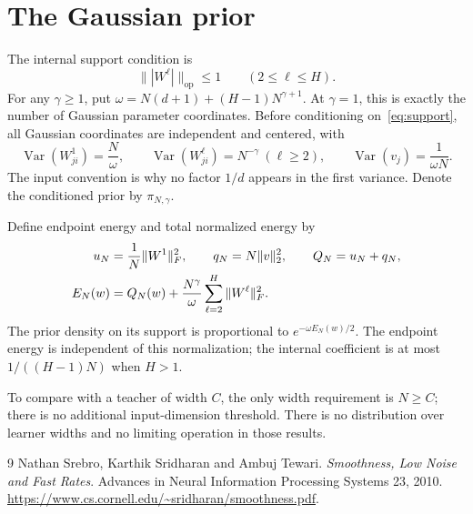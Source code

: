 \documentclass[11pt]{article}
\theoremstyle{definition}\newtheorem{definition}[theorem]{Definition}
\theoremstyle{remark}\newtheorem{remark}[theorem]{Remark}
\newcommand{\op}{\mathrm{op}}\newcommand{\VarPath}{\mathcal V}
\begin{document}
\section{The Gaussian prior}
The internal support condition is
\begin{equation}
 \bigl\||W^\ell|\bigr\|_{\op}\le1\qquad(2\le\ell\le H).
 \label{eq:support}
\end{equation}
For any $\gamma\ge1$, put $\omega=N(d+1)+(H-1)N^{\gamma+1}$. At $\gamma=1$, this is exactly the number of Gaussian parameter coordinates. Before conditioning on~\eqref{eq:support}, all Gaussian coordinates are independent and centered, with
\begin{equation}
 \operatorname{Var}(W^1_{ji})=\frac N\omega,\qquad
 \operatorname{Var}(W^\ell_{ji})=N^{-\gamma}\ (\ell\ge2),\qquad
 \operatorname{Var}(v_j)=\frac1{\omega N}.
 \label{eq:prior}
\end{equation}
The input convention is why no factor $1/d$ appears in the first variance. Denote the conditioned prior by $\pi_{N,\gamma}$.

Define endpoint energy and total normalized energy by
\begin{align}
 u_N&=\frac1N\|W^1\|_F^2,\qquad q_N=N\|v\|_2^2,\qquad Q_N=u_N+q_N,\notag\\
 E_N(w)&=Q_N(w)+\frac{N^\gamma}{\omega}\sum_{\ell=2}^H\|W^\ell\|_F^2.
 \label{eq:energy}
\end{align}
The prior density on its support is proportional to $e^{-\omega E_N(w)/2}$. The endpoint energy is independent of this normalization; the internal coefficient is at most $1/((H-1)N)$ when $H>1$.

To compare with a teacher of width $C$, the only width requirement is $N\ge C$; there is no additional input-dimension threshold. There is no distribution over learner widths and no limiting operation in those results.







\begin{thebibliography}{9}
 Nathan Srebro, Karthik Sridharan and Ambuj Tewari. \emph{Smoothness, Low Noise and Fast Rates}. Advances in Neural Information Processing Systems 23, 2010. \url{https://www.cs.cornell.edu/~sridharan/smoothness.pdf}.
\end{thebibliography}
\end{document}
